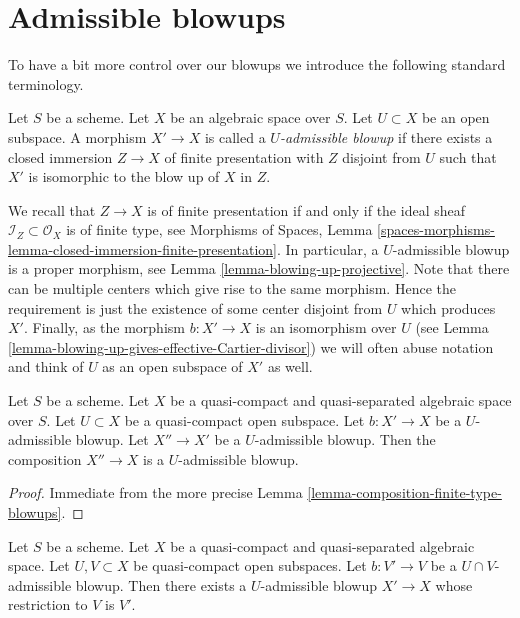 \section{Admissible blowups}
\label{section-admissible-blowups}

\noindent
To have a bit more control over our blowups we introduce the following
standard terminology.

\begin{definition}
\label{definition-admissible-blowup}
Let $S$ be a scheme. Let $X$ be an algebraic space over $S$.
Let $U \subset X$ be an open subspace. A morphism
$X' \to X$ is called a {\it $U$-admissible blowup} if there exists a
closed immersion $Z \to X$ of finite presentation with $Z$ disjoint from
$U$ such that $X'$ is isomorphic to the blow up of $X$ in $Z$.
\end{definition}

\noindent
We recall that $Z \to X$ is of finite presentation if and only if the
ideal sheaf $\mathcal{I}_Z \subset \mathcal{O}_X$ is of finite type, see
Morphisms of Spaces, Lemma
\ref{spaces-morphisms-lemma-closed-immersion-finite-presentation}.
In particular, a $U$-admissible blowup is a proper morphism, see
Lemma \ref{lemma-blowing-up-projective}.
Note that there can be multiple centers which give rise to the same morphism.
Hence the requirement is just the existence of some center disjoint from
$U$ which produces $X'$.
Finally, as the morphism $b : X' \to X$ is an isomorphism over $U$ (see
Lemma \ref{lemma-blowing-up-gives-effective-Cartier-divisor}) we will often
abuse notation and think of $U$ as an open subspace of $X'$ as well.

\begin{lemma}
\label{lemma-composition-admissible-blowups}
Let $S$ be a scheme.
Let $X$ be a quasi-compact and quasi-separated algebraic space over $S$.
Let $U \subset X$ be a quasi-compact open subspace.
Let $b : X' \to X$ be a $U$-admissible blowup.
Let $X'' \to X'$ be a $U$-admissible blowup.
Then the composition $X'' \to X$ is a $U$-admissible blowup.
\end{lemma}

\begin{proof}
Immediate from the more precise
Lemma \ref{lemma-composition-finite-type-blowups}.
\end{proof}

\begin{lemma}
\label{lemma-extend-admissible-blowups}
Let $S$ be a scheme.
Let $X$ be a quasi-compact and quasi-separated algebraic space.
Let $U, V \subset X$ be quasi-compact open subspaces.
Let $b : V' \to V$ be a $U \cap V$-admissible blowup.
Then there exists a $U$-admissible blowup $X' \to X$
whose restriction to $V$ is $V'$.
\end{lemma}

